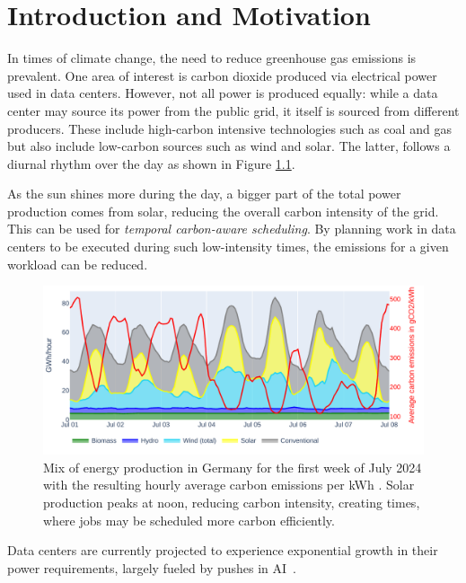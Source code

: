 \chapter{Introduction and Motivation}

In times of climate change, the need to reduce greenhouse gas emissions is prevalent. 
One area of interest is carbon dioxide produced via electrical power used in data centers. 
However, not all power is produced equally: while a data center may source its power from the public grid, it itself is sourced from different producers. 
These include high-carbon intensive technologies such as coal and gas but also include low-carbon sources such as wind and solar. 
The latter, follows a diurnal rhythm over the day as shown in Figure \ref{fig:energy_mix}.

As the sun shines more during the day, a bigger part of the total power production comes from solar, reducing the overall carbon intensity of the grid.
This can be used for \emph{temporal carbon-aware scheduling}. 
By planning work in data centers to be executed during such low-intensity times, the emissions for a given workload can be reduced.

\begin{figure}[H] %
    \includegraphics[width=\linewidth]{agorameter/energy_production_week.pdf}
    \caption[short]{Mix of energy production in Germany for the first week of July 2024 with the resulting hourly average carbon emissions per kWh . Solar production peaks at noon, reducing carbon intensity, creating times, where jobs may be scheduled more carbon efficiently.}
    \label{fig:energy_mix}
\end{figure}

Data centers are currently projected to experience exponential growth in their power requirements, largely fueled by pushes in AI~\cite{schwartz_green_2019}.

